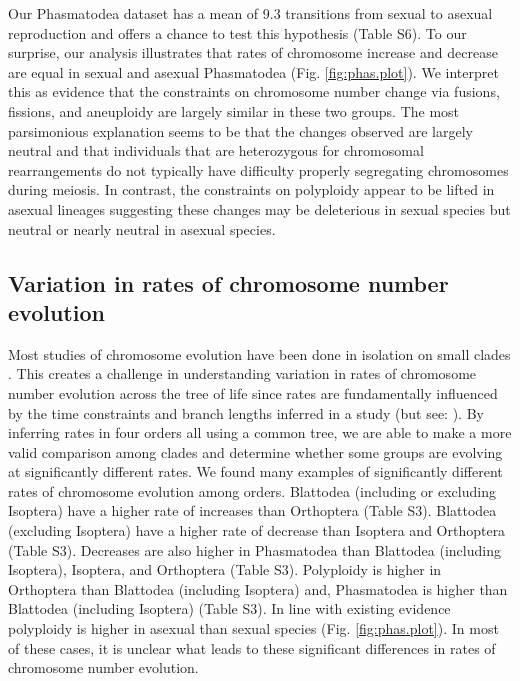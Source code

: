 \documentclass[]{rsos}%
\begin{document}
Our Phasmatodea dataset has a mean of 9.3 transitions from sexual to asexual reproduction and offers a chance to test this hypothesis (Table S6).
To our surprise, our analysis illustrates that rates of chromosome increase and decrease are equal in sexual and asexual Phasmatodea (Fig. \ref{fig:phas.plot}).
We interpret this as evidence that the constraints on chromosome number change via fusions, fissions, and aneuploidy are largely similar in these two groups.
The most parsimonious explanation seems to be that the changes observed are largely neutral and that individuals that are heterozygous for chromosomal rearrangements do not typically have difficulty properly segregating chromosomes during meiosis.
In contrast, the constraints on polyploidy appear to be lifted in asexual lineages suggesting these changes may be deleterious in sexual species but neutral or nearly neutral in asexual species.


\subsection{Variation in rates of chromosome number evolution}
Most studies of chromosome evolution have been done in isolation on small clades \cite{rockman2002, mccann2016, deoliveira}. 
This creates a challenge in understanding variation in rates of chromosome number evolution across the tree of life since rates are fundamentally influenced by the time constraints and branch lengths inferred in a study (but see: \cite{blackmon2019meiotic, zenil2017}).
By inferring rates in four orders all using a common tree, we are able to make a more valid comparison among clades and determine whether some groups are evolving at significantly different rates.
We found many examples of significantly different rates of chromosome evolution among orders.
Blattodea (including or excluding Isoptera) have a higher rate of increases than Orthoptera (Table S3).
Blattodea (excluding Isoptera) have a higher rate of decrease than Isoptera and Orthoptera  (Table S3).
Decreases are also higher in Phasmatodea than Blattodea (including Isoptera), Isoptera, and Orthoptera  (Table S3).
Polyploidy is higher in Orthoptera than Blattodea (including Isoptera) and, Phasmatodea is higher than Blattodea (including Isoptera)  (Table S3).
In line with existing evidence \cite{lokki1980polyploidy, blackmon2016} polyploidy is higher in asexual than sexual species (Fig. \ref{fig:phas.plot}).
In most of these cases, it is unclear what leads to these significant differences in rates of chromosome number evolution.
\end{document}
